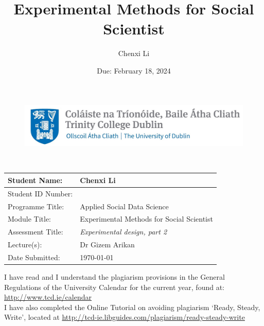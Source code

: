 \documentclass[12pt]{article} %
\title{Experimental Methods for Social Scientist }
\date{Due: February 18, 2024}
\author{Chenxi Li}
\begin{document}
\begin{figure}[h]
	\centering
	\vspace{-2.5cm}
	\hspace{-8cm}
	\includegraphics[width=12cm]{Trinity_icon.jpg}  
\end{figure}

\vspace{.5cm}
\begin{center}
\\
\end{center}

\vspace{.7cm}


\begin{center}
		\begin{tabular}{|>{\arraybackslash}p{4cm}|>{\arraybackslash}p{8cm}|}
			\hline
			Student Name: & Chenxi Li\\
			\hline
			Student ID Number: & 23330541 \\
			\hline
			Programme Title: & Applied Social Data Science \\
			\hline
			Module Title: & Experimental Methods for Social Scientist \\
			\hline
			Assessment Title: & \textit{Experimental design, part 2 }\\
			\hline
			Lecture(s): & Dr Gizem Arikan \\
			\hline
			Date Submitted: & \today \\
			\hline
		\end{tabular}
\end{center}

\vspace{.7cm}

\noindent I have read and I understand the plagiarism provisions in the General Regulations of the University Calendar for the current year, found at:  \url{http://www.tcd.ie/calendar} \\

\noindent I have also completed the Online Tutorial on avoiding plagiarism ‘Ready, Steady, Write’, located at \url{http://tcd-ie.libguides.com/plagiarism/ready-steady-write} \\
\end{document}
